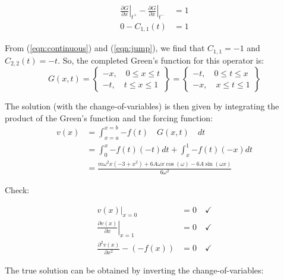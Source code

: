 \documentclass[10pt]{article}
\begin{document}
\begin{equation}
\label{eqn:jump}
 \begin{split}
  \left. \frac{\partial G}{\partial x} \right| _{t^+} - \left. \frac{\partial G}{\partial x} \right| _{t^-} &= 1 \\
  0 - C_{1,1}(t) &= 1
 \end{split}
\end{equation}

From (\ref{eqn:continuous}) and (\ref{eqn:jump}), we find that $C_{1,1}=-1$ and $C_{2,2}(t)=-t$. So, the completed Green's function for this operator is:
\begin{equation}
\label{eqn:green}
G(x,t) = 
 \left\{ \begin{matrix}
    -x, \quad 0 \le x \le t \\ 
    -t, \quad t \le x \le 1
    \end{matrix} \right\}
    =
    \left\{ \begin{matrix}
    -t, \quad 0 \le t \le x \\ 
    -x, \quad x \le t \le 1
    \end{matrix} \right\} 
\end{equation}

The solution (with the change-of-variables) is then given by integrating the product of the Green's function and the forcing function:
\begin{equation}
\label{eqn:v(x)}
 \begin{split}
  v(x) &= \int_{x=a}^{x=b}{-f(t) \quad G(x,t) \quad dt} \\
  &= \int_{0}^{x}{-f(t)(-t)dt} + \int_{x}^{1}{-f(t)(-x)dt} \\
  &= \frac{m \omega^2 x (-3 + x^2) + 6 A \omega x \cos(\omega) - 
 6 A \sin(\omega x)}{6 \omega^2}
 \end{split}
\end{equation}

Check:
    
\begin{equation}
 \begin{split}
  \left. v(x) \right|_{x=0} &= 0 \quad \checkmark \\
  \left. \frac{\partial v(x)}{\partial x} \right|_{x=1} &= 0 \quad \checkmark \\
  \frac{\partial^2 v(x)}{\partial x^2} - (-f(x)) &= 0 \quad \checkmark
 \end{split}
\end{equation}


The true solution can be obtained by inverting the change-of-variables:
    
\end{document}
